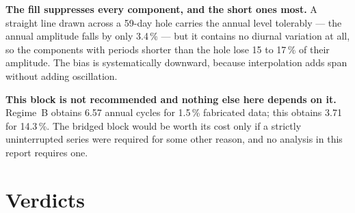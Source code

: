 \documentclass[11pt,a4paper]{article}
\begin{document}

\textbf{The fill suppresses every component, and the short ones most.} A straight
line drawn across a 59-day hole carries the annual level tolerably --- the annual
amplitude falls by only 3.4\,\% --- but it contains no diurnal variation at all,
so the components with periods shorter than the hole lose 15 to 17\,\% of their
amplitude. The bias is systematically downward, because interpolation adds span
without adding oscillation.

\textbf{This block is not recommended and nothing else here depends on it.}
Regime~B obtains 6.57 annual cycles for 1.5\,\% fabricated data; this obtains
3.71 for 14.3\,\%. The bridged block would be worth its cost only if a strictly
uninterrupted series were required for some other reason, and no analysis in this
report requires one.

\section{Verdicts}
\end{document}
